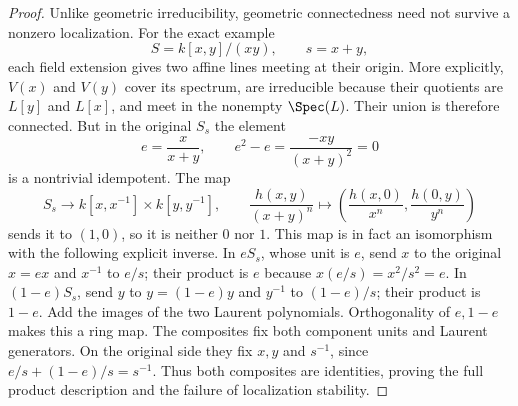\begin{proof}
Unlike geometric irreducibility,
geometric connectedness need
not survive a nonzero localization.
For the exact example
$$
S=k[x,y]/(xy),\qquad s=x+y,
$$
each field extension gives
two affine lines meeting at
their origin. More explicitly,
$V(x)$ and $V(y)$ cover its
spectrum, are irreducible
because their quotients are
$L[y]$ and $L[x]$, and meet
in the nonempty $\Spec(L)$.
Their union is therefore
connected. But in the original
$S_s$ the element
$$
e=\frac{x}{x+y},\qquad
e^2-e=\frac{-xy}{(x+y)^2}=0
$$
is a nontrivial idempotent.
The map
$$
S_s\longrightarrow k[x,x^{-1}]\times k[y,y^{-1}],
\qquad\frac{h(x,y)}{(x+y)^n}
\longmapsto\left(\frac{h(x,0)}{x^n},\frac{h(0,y)}{y^n}\right)
$$
sends it to $(1,0)$, so it
is neither $0$ nor $1$.
This map is in fact an
isomorphism with the following
explicit inverse. In $eS_s$,
whose unit is $e$, send $x$
to the original $x=ex$ and
$x^{-1}$ to $e/s$; their
product is $e$ because
$x(e/s)=x^2/s^2=e$.
In $(1-e)S_s$, send $y$ to
$y=(1-e)y$ and $y^{-1}$ to
$(1-e)/s$; their product is
$1-e$. Add the images of
the two Laurent polynomials.
Orthogonality of $e,1-e$
makes this a ring map.
The composites fix both
component units and Laurent
generators. On the original
side they fix $x,y$ and
$s^{-1}$, since
$e/s+(1-e)/s=s^{-1}$.
Thus both composites are
identities, proving the full
product description and the
failure of localization stability.
\end{proof}